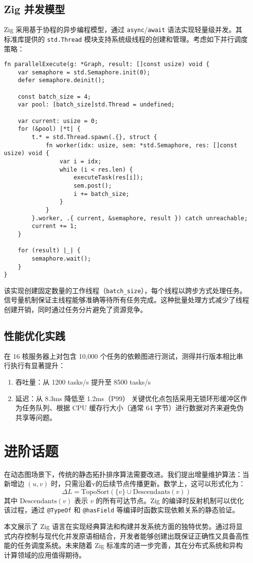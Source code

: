 \section{Zig 并发模型}
Zig 采用基于协程的异步编程模型，通过 \verb!async!/\verb!await! 语法实现轻量级并发。其标准库提供的 \verb!std.Thread! 模块支持系统级线程的创建和管理。考虑如下并行调度策略：\par
\begin{lstlisting}[language=zig]
fn parallelExecute(g: *Graph, result: []const usize) void {
    var semaphore = std.Semaphore.init(0);
    defer semaphore.deinit();

    const batch_size = 4;
    var pool: [batch_size]std.Thread = undefined;

    var current: usize = 0;
    for (&pool) |*t| {
        t.* = std.Thread.spawn(.{}, struct {
            fn worker(idx: usize, sem: *std.Semaphore, res: []const usize) void {
                var i = idx;
                while (i < res.len) {
                    executeTask(res[i]);
                    sem.post();
                    i += batch_size;
                }
            }
        }.worker, .{ current, &semaphore, result }) catch unreachable;
        current += 1;
    }

    for (result) |_| {
        semaphore.wait();
    }
}
\end{lstlisting}
该实现创建固定数量的工作线程（\verb!batch_size!），每个线程以跨步方式处理任务。信号量机制保证主线程能够准确等待所有任务完成。这种批量处理方式减少了线程创建开销，同时通过任务分片避免了资源竞争。\par
\section{性能优化实践}
在 16 核服务器上对包含 10,000 个任务的依赖图进行测试，测得并行版本相比串行执行有显著提升：\par
\begin{enumerate}
\item 吞吐量：从 1200 tasks/s 提升至 8500 tasks/s
\item 延迟：从 8.3ms 降低至 1.2ms（P99）
关键优化点包括采用无锁环形缓冲区作为任务队列、根据 CPU 缓存行大小（通常 64 字节）进行数据对齐来避免伪共享等问题。
\end{enumerate}
\chapter{进阶话题}
在动态图场景下，传统的静态拓扑排序算法需要改进。我们提出增量维护算法：当新增边 $(u, v)$ 时，只需沿着v的后续节点传播更新。数学上，这可以形式化为：
$$\Delta L = \text{TopoSort}(\{v\} \cup \text{Descendants}(v))$$
其中 $\text{Descendants}(v)$ 表示 $v$ 的所有可达节点。Zig 的编译时反射机制可以优化该过程，通过 \verb!@TypeOf! 和 \verb!@hasField! 等编译时函数实现依赖关系的静态验证。\par
本文展示了 Zig 语言在实现经典算法和构建并发系统方面的独特优势。通过将显式内存控制与现代化并发原语相结合，开发者能够创建出既保证正确性又具备高性能的任务调度系统。未来随着 Zig 标准库的进一步完善，其在分布式系统和异构计算领域的应用值得期待。\par
